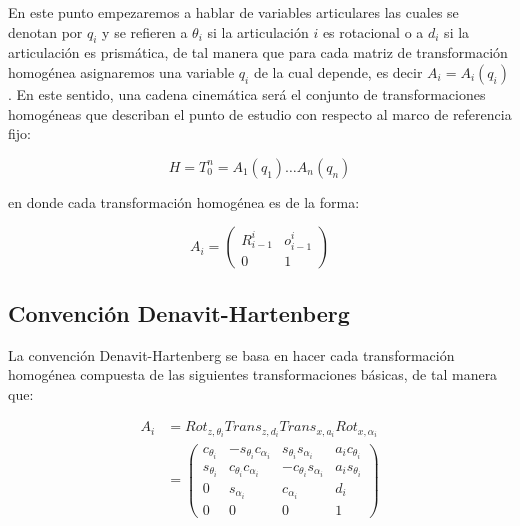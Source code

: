 \begin{multicols*}{3}
        En este punto empezaremos a hablar de variables articulares las cuales se denotan por $q_i$ y se refieren a $\theta_i$ si la articulación $i$ es rotacional o a $d_i$ si la articulación es prismática, de tal manera que para cada matriz de transformación homogénea asignaremos una variable $q_i$ de la cual depende, es decir $A_i = A_i(q_i)$. En este sentido, una cadena cinemática será el conjunto de transformaciones homogéneas que describan el punto de estudio con respecto al marco de referencia fijo:

        \begin{equation}
            H = T_0^n = A_1(q_1) \dots A_n(q_n)
        \end{equation}

        en donde cada transformación homogénea es de la forma:

        \begin{equation}
            A_i =
            \begin{pmatrix}
                R_{i-1}^i & o_{i-1}^i \\
                0 & 1
            \end{pmatrix}
        \end{equation}


        \subsection{Convención Denavit-Hartenberg}

            La convención Denavit-Hartenberg se basa en hacer cada transformación homogénea compuesta de las siguientes transformaciones básicas, de tal manera que:

            \begin{align}
                A_i &= Rot_{z, \theta_i} Trans_{z, d_i} Trans_{x, a_i} Rot_{x, \alpha_i} \nonumber \\
                &=
                \begin{pmatrix}
                    c_{\theta_i} & -s_{\theta_i} c_{\alpha_i} & s_{\theta_i} s_{\alpha_i} & a_i c_{\theta_i} \\
                    s_{\theta_i} & c_{\theta_i} c_{\alpha_i} & -c_{\theta_i} s_{\alpha_i} & a_i s_{\theta_i} \\
                    0 & s_{\alpha_i} & c_{\alpha_i} & d_i \\
                    0 & 0 & 0 & 1
                \end{pmatrix}
            \end{align}


\end{multicols*}
